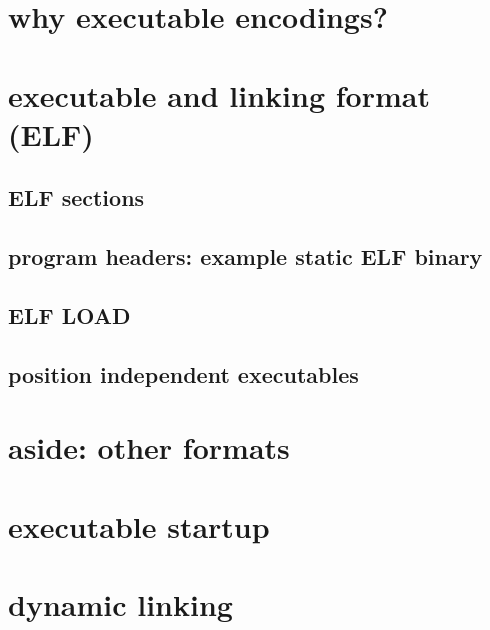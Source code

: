 
\section{why executable encodings?}


\section{executable and linking format (ELF)}



\subsection{ELF sections}




\subsection{program headers: example static ELF binary}



\subsection{ELF LOAD}


\subsection{position independent executables}



\section{aside: other formats}



\section{executable startup} %



\section{dynamic linking}

